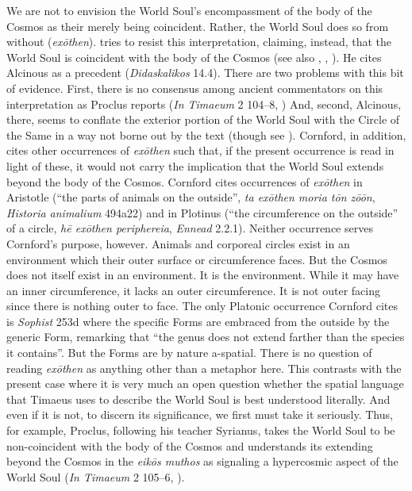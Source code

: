 We are not to envision the World Soul's encompassment of the body of the Cosmos as their merely being coincident. Rather, the World Soul does so from without (\emph{exōthen}). \citet[58]{Cornford:1935fk} tries to resist this interpretation, claiming, instead, that the World Soul is coincident with the body of the Cosmos (see also \citealt[105]{Taylor:1928qb}, \citealt[85]{Skemp:1942oc}, \citealt[70]{Robinson:1970lq}). He cites Alcinous as a precedent (\emph{Didaska\-likos} 14.4). There are two problems with this bit of evidence. First, there is no consensus among ancient commentators on this interpretation as Proclus reports (\emph{In Timaeum} 2 104--8, \citealt{Diehl:1903re}) And, second, Alcinous, there, seems to conflate the exterior portion of the World Soul with the Circle of the Same in a way not borne out by the text (though see \citealt[105]{Taylor:1928qb}). Cornford, in addition, cites other occurrences of \emph{exōthen} such that, if the present occurrence is read in light of these, it would not carry the implication that the World Soul extends beyond the body of the Cosmos. Cornford cites occurrences of \emph{exōthen} in Aristotle (``the parts of animals on the outside'', \emph{ta exōthen moria tōn zōōn}, \emph{Historia animalium} 494a22) and in Plotinus (``the circumference on the outside'' of a circle, \emph{hē exōthen periphereia}, \emph{Ennead} 2.2.1). Neither occurrence serves Cornford's purpose, however. Animals and corporeal circles exist in an environment which their outer surface or circumference faces. But the Cosmos does not itself exist in an environment. It is the environment. While it may have an inner circumference, it lacks an outer circumference. It is not outer facing since there is nothing outer to face. The only Platonic occurrence Cornford cites is \emph{Sophist} 253d where the specific Forms are embraced from the outside by the generic Form, remarking that ``the genus does not extend farther than the species it contains''. But the Forms are by nature a-spatial. There is no question of reading \emph{exōthen} as anything other than a metaphor here. This contrasts with the present case where it is very much an open question whether the spatial language that Timaeus uses to describe the World Soul is best understood literally. And even if it is not, to discern its significance, we first must take it seriously. Thus, for example, Proclus, following his teacher Syrianus, takes the World Soul to be non-coincident with the body of the Cosmos and understands its extending beyond the Cosmos in the \emph{eikōs muthos} as signaling a hypercosmic aspect of the World Soul (\emph{In Timaeum} 2 105--6, \citealt{Diehl:1903re}).

